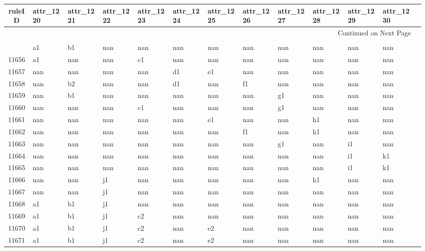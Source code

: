 \documentclass{article}%
\begin{document}
%
\normalsize%
\begin{longtable}{c|llllllllllll}%
\hline%
ruleID&attr\_1220&attr\_1221&attr\_1222&attr\_1223&attr\_1224&attr\_1225&attr\_1226&attr\_1227&attr\_1228&attr\_1229&attr\_1230\\%
\hline%
\endhead%
\hline%
\multicolumn{12}{r}{Continued on Next Page}\\%
\hline%
\endfoot%
\hline%
\multicolumn{12}{r}{Not Continued on Next Page}\\%
\hline%
\endlastfoot%
11655&a1&b1&nan&nan&nan&nan&nan&nan&nan&nan&nan\\%
11656&a1&nan&nan&c1&nan&nan&nan&nan&nan&nan&nan\\%
11657&nan&nan&nan&nan&d1&e1&nan&nan&nan&nan&nan\\%
11658&nan&b2&nan&nan&d1&nan&f1&nan&nan&nan&nan\\%
11659&nan&b1&nan&nan&nan&nan&nan&g1&nan&nan&nan\\%
11660&nan&nan&nan&c1&nan&nan&nan&g1&nan&nan&nan\\%
11661&nan&nan&nan&nan&nan&e1&nan&nan&h1&nan&nan\\%
11662&nan&nan&nan&nan&nan&nan&f1&nan&h1&nan&nan\\%
11663&nan&nan&nan&nan&nan&nan&nan&g1&nan&i1&nan\\%
11664&nan&nan&nan&nan&nan&nan&nan&nan&nan&i1&k1\\%
11665&nan&nan&nan&nan&nan&nan&nan&nan&nan&i1&k1\\%
11666&nan&nan&j1&nan&nan&nan&nan&nan&h1&nan&nan\\%
11667&nan&nan&j1&nan&nan&nan&nan&nan&nan&nan&nan\\%
11668&a1&b1&j1&nan&nan&nan&nan&nan&nan&nan&nan\\%
11669&a1&b1&j1&c2&nan&nan&nan&nan&nan&nan&nan\\%
11670&a1&b1&j1&c2&nan&e2&nan&nan&nan&nan&nan\\%
11671&a1&b1&j1&c2&nan&e2&nan&nan&nan&nan&nan\\%
\end{longtable}%
\end{document}
